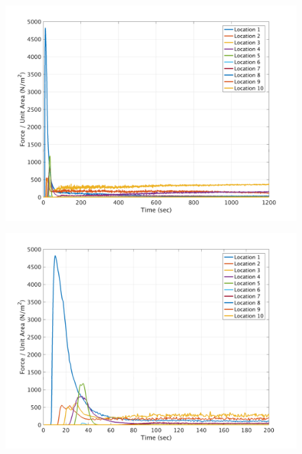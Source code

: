 \documentclass[a4paper,10pt]{article}
\begin{document}
\begin{figure}[H]
	\begin{minipage}[b]{0.5\linewidth}
	\centering
    \includegraphics[width=1\textwidth]{MeansAll/FnetP.png}
        \label{fig:M_FnP}
	\end{minipage}	
	\begin{minipage}[b]{0.5\linewidth}
	\centering
    \includegraphics[width=1\textwidth]{MeansAll/FnetP_0-200.png}
        \label{fig:M_FnPz}
	\end{minipage}


\end{figure}
\end{document}
